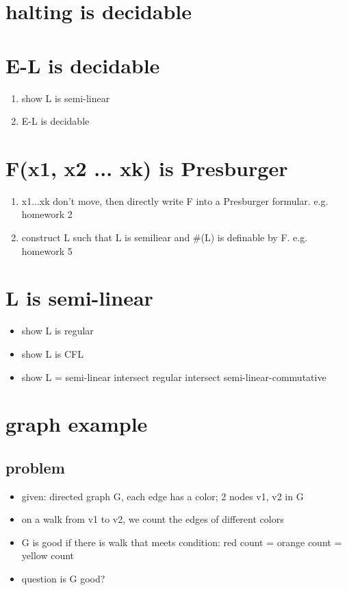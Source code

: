 \documentclass{article}
\begin{document}
\section{halting is decidable}

\section{E-L is decidable}
\begin{enumerate}
	\item show L is semi-linear
	\item E-L is decidable
\end{enumerate}

\section{F(x1, x2 ... xk) is Presburger}
\begin{enumerate}
	\item x1...xk don't move, then directly write F into a Presburger formular. e.g. homework 2
	\item construct L such that L is semiliear and \#(L) is definable by F. e.g. homework 5
\end{enumerate}

\section{L is semi-linear}
\begin{itemize}
	\item show L is regular
	\item show L is CFL
	\item show L = semi-linear intersect regular intersect semi-linear-commutative
\end{itemize}

\section{graph example}

\subsection{problem}
\begin{itemize}
	\item given: directed graph G, each edge has a color; 2 nodes v1, v2 in G
	\item on a walk from v1 to v2, we count the edges of different colors
	\item G is good if there is walk that meets condition: red count = orange count = yellow count
	\item question is G good?
\end{itemize}
\end{document}
